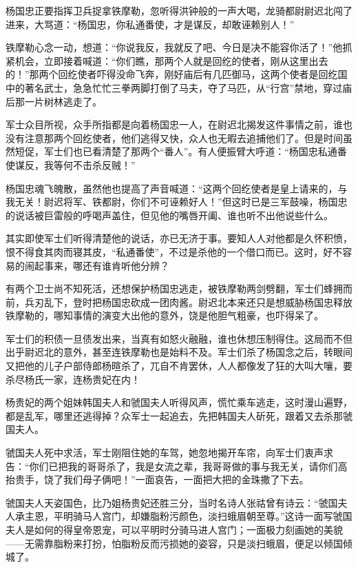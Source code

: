 \documentclass[12pt,oneside]{book}
\begin{document}
杨国忠正要指挥卫兵捉拿铁摩勒，忽听得洪钟般的一声大喝，龙骑都尉尉迟北闯了进来，大骂道：``杨国忠，你私通番使，才是谋反，却敢诬赖别人！''

铁摩勒心念一动，想道：``你说我反，我就反了吧、今日是决不能容你活了！''他抓紧机会，立即接着喊道：``你们瞧，那两个人就是回纥的使者，刚从这里出去的！''那两个回纥使者吓得没命飞奔，刚好庙后有几匹御马，这两个使者是回纥国中的著名武士，急急忙忙三拳两脚打倒了马夫，夺了马匹，从``行宫''禁地，穿过庙后那一片树林逃走了。

军士众目所视，众手所指都是向着杨国忠一人，在尉迟北揭发这件事情之前，谁也没有注意那两个回纥使者，他们逃得又快，众人也无暇去追捕他们了。但是时间虽然短促，军士们也已看清楚了那两个``番人''。有人便振臂大呼道：``杨国忠私通番使谋反，我等何不击杀反贼！''

杨国忠魂飞魄散，虽然他也提高了声音喊道：``这两个回纥使者是皇上请来的，与我无关！尉迟将军、铁都尉，你们不可诬赖好人！''但这时已是三军鼓噪，杨国忠的说话被巨雷般的呼喝声盖住，但见他的嘴唇开阖、谁也听不出他说些什么。

其实即使军士们听得清楚他的说话，亦已无济于事。要知人人对他都是久怀积愤，恨不得食其肉而寝其皮，``私通番使''，不过是杀他的一个借口而已。这时，好不容易的闹起事来，哪还有谁肯听他分辨？

有两个卫士尚不知死活，还想保护杨国忠逃走，被铁摩勒两剑劈翻，军士们蜂拥而前，兵刃乱下，登时把杨国忠砍成一团肉酱。尉迟北本来还只是想威胁杨国忠释放铁摩勒的，哪知事情的演变大出他的意外，饶是他胆气粗豪，也吓得呆了。

军士们的积债一旦债发出来，当真有如怒火融融，谁也休想压制得住。这局而不但出乎尉迟北的意外，甚至连铁摩勒也是始料不及。军士们杀了杨国念之后，转眼间又把他的儿子户部侍郎杨暄杀了，兀自不肯罢休，人人都像发了狂的大叫大嚷，要杀尽杨氏一家，连杨贵妃在内！

杨贵妃的两个姐妹韩国夫人和虢国夫人听得风声，慌忙乘车逃走，这时漫山遍野，都是乱军，哪里还逃得掉？众军士一起追去，先把韩国夫人斫死，跟着又去杀那虢国夫人。

虢国夫人死中求活，军士刚阻住她的车驾，她忽地揭开车帘，向军士们衷声求告：``你们已把我的哥哥杀了，我是女流之辈，我哥哥做的事与我无关，请你们高抬贵手，饶了我们母子俩吧！''一面哀告，一面把大把的金珠撒了下去。

虢国夫人天姿国色，比乃姐杨贵妃还胜三分，当时名诗人张祜曾有诗云：``虢国夫人承主恩，平明骑马人宫门，却嫌脂粉污颜色，淡扫蛾眉朝至尊。''这诗一面写虢国夫人是如何的得皇帝恩宠，可以平明时分骑马进人宫门；一面极力刻画她的美貌------无需靠脂粉来打扮，怕脂粉反而污损她的姿容，只是淡扫蛾眉，便足以倾国倾城了。
\end{document}
